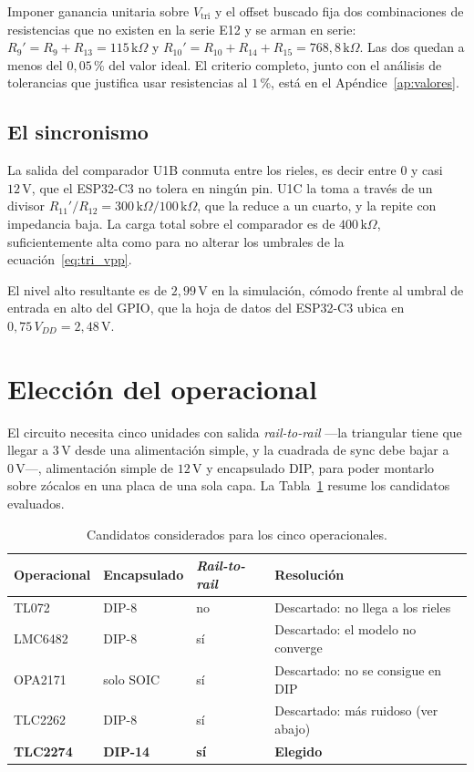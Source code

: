 \documentclass[12pt, a4paper, twoside]{report}
\begin{document}
Imponer ganancia unitaria sobre $V_\text{tri}$ y el offset buscado fija dos
combinaciones de resistencias que no existen en la serie E12 y se arman en
serie: $R_9' = R_9 + R_{13} = 115\,\text{k}\Omega$ y $R_{10}' = R_{10} +
R_{14} + R_{15} = 768{,}8\,\text{k}\Omega$. Las dos quedan a menos del
$0{,}05$\,\% del valor ideal. El criterio completo, junto con el análisis de
tolerancias que justifica usar resistencias al $1$\,\%, está en el
Apéndice~\ref{ap:valores}.

\subsection{El sincronismo}
\label{sub:tri_sync}

La salida del comparador U1B conmuta entre los rieles, es decir entre $0$ y
casi $12\,\text{V}$, que el ESP32-C3 no tolera en ningún pin. U1C la toma a
través de un divisor $R_{11}'/R_{12} = 300\,\text{k}\Omega/100\,\text{k}\Omega$,
que la reduce a un cuarto, y la repite con impedancia baja. La carga total
sobre el comparador es de $400\,\text{k}\Omega$, suficientemente alta como
para no alterar los umbrales de la ecuación~\eqref{eq:tri_vpp}.

El nivel alto resultante es de $2{,}99\,\text{V}$ en la simulación, cómodo
frente al umbral de entrada en alto del GPIO, que la hoja de datos del
ESP32-C3 ubica en $0{,}75\,V_{DD} = 2{,}48\,\text{V}$.

\section{Elección del operacional}
\label{sec:tri_opamp}

El circuito necesita cinco unidades con salida \textit{rail-to-rail} ---la
triangular tiene que llegar a $3\,\text{V}$ desde una alimentación simple, y
la cuadrada de sync debe bajar a $0\,\text{V}$---, alimentación simple de
$12\,\text{V}$ y encapsulado DIP, para poder montarlo sobre zócalos en una
placa de una sola capa. La Tabla~\ref{tab:tri_opamp} resume los candidatos
evaluados.

\begin{table}[H]
  \centering
  \caption{Candidatos considerados para los cinco operacionales.}
  \label{tab:tri_opamp}
  \begin{tabular}{llll}
    \toprule
    Operacional & Encapsulado & \textit{Rail-to-rail} & Resolución \\
    \midrule
    TL072    & DIP-8            & no  & Descartado: no llega a los rieles \\
    LMC6482  & DIP-8            & sí  & Descartado: el modelo no converge \\
    OPA2171  & solo SOIC        & sí  & Descartado: no se consigue en DIP \\
    TLC2262  & DIP-8            & sí  & Descartado: más ruidoso (ver abajo) \\
    \textbf{TLC2274} & \textbf{DIP-14} & \textbf{sí} & \textbf{Elegido} \\
    \bottomrule
  \end{tabular}
\end{table}
\end{document}
